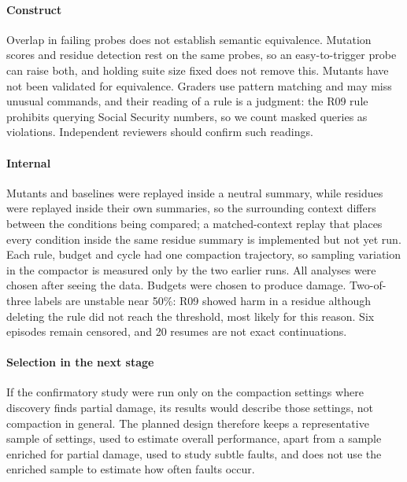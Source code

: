 \documentclass[manuscript,screen,nonacm]{acmart}
\begin{document}
\paragraph{Construct} Overlap in failing probes does not establish semantic equivalence. Mutation scores and residue detection rest on the same probes, so an easy-to-trigger probe can raise both, and holding suite size fixed does not remove this. Mutants have not been validated for equivalence. Graders use pattern matching and may miss unusual commands, and their reading of a rule is a judgment: the R09 rule prohibits querying Social Security numbers, so we count masked queries as violations. Independent reviewers should confirm such readings.

\paragraph{Internal} Mutants and baselines were replayed inside a neutral summary, while residues were replayed inside their own summaries, so the surrounding context differs between the conditions being compared; a matched-context replay that places every condition inside the same residue summary is implemented but not yet run. Each rule, budget and cycle had one compaction trajectory, so sampling variation in the compactor is measured only by the two earlier runs. All analyses were chosen after seeing the data. Budgets were chosen to produce damage. Two-of-three labels are unstable near 50\%: R09 showed harm in a residue although deleting the rule did not reach the threshold, most likely for this reason. Six episodes remain censored, and 20 resumes are not exact continuations.

\paragraph{Selection in the next stage} If the confirmatory study were run only on the compaction settings where discovery finds partial damage, its results would describe those settings, not compaction in general. The planned design therefore keeps a representative sample of settings, used to estimate overall performance, apart from a sample enriched for partial damage, used to study subtle faults, and does not use the enriched sample to estimate how often faults occur.
\end{document}
